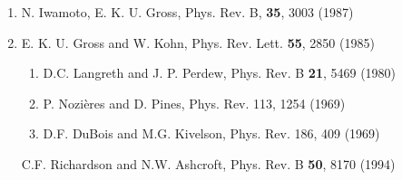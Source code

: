 \documentclass[12pt]{article}
\renewcommand{\_}{\kern-1.5pt\textunderscore\kern-1.5pt}
\begin{document}
\begin{enumerate}
	\item N. Iwamoto, E. K. U. Gross, Phys. Rev. B, \textbf{35}, 3003 (1987)\par

	\item E. K. U. Gross and W. Kohn, Phys. Rev. Lett. \textbf{55}, 2850 (1985)\par


\vspace{\baselineskip}
\setlength{\parskip}{9.96pt}

\vspace{\baselineskip}
\setlength{\parskip}{0.0pt}
\setlength{\parskip}{9.96pt}
\setlength{\parskip}{0.0pt}
\begin{enumerate}
	\item D.C. Langreth and J. P. Perdew, Phys. Rev. B \textbf{21}, 5469 (1980)\par

	\item P. Nozières and D. Pines, Phys. Rev. 113, 1254 (1969)\par

	\item D.F. DuBois and M.G. Kivelson, Phys. Rev. 186, 409 (1969)
\end{enumerate}\par

C.F. Richardson and N.W. Ashcroft, Phys. Rev. B \textbf{50}, 8170 (1994)\par


\vspace{\baselineskip}
\setlength{\parskip}{9.96pt}

\vspace{\baselineskip}
\setlength{\parskip}{0.0pt}
\setlength{\parskip}{9.96pt}

\vspace{\baselineskip}
\setlength{\parskip}{0.0pt}
\setlength{\parskip}{9.96pt}

\end{enumerate}
\printbibliography
\end{document}
